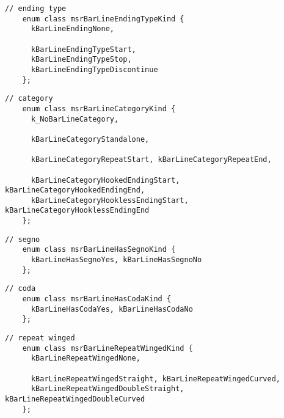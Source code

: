 \begin{lstlisting}[language=CPlusPlus]
    // ending type
    enum class msrBarLineEndingTypeKind {
      kBarLineEndingNone,

      kBarLineEndingTypeStart,
      kBarLineEndingTypeStop,
      kBarLineEndingTypeDiscontinue
    };
\end{lstlisting}

\begin{lstlisting}[language=CPlusPlus]
    // category
    enum class msrBarLineCategoryKind {
      k_NoBarLineCategory,

      kBarLineCategoryStandalone,

      kBarLineCategoryRepeatStart, kBarLineCategoryRepeatEnd,

      kBarLineCategoryHookedEndingStart, kBarLineCategoryHookedEndingEnd,
      kBarLineCategoryHooklessEndingStart, kBarLineCategoryHooklessEndingEnd
    };
\end{lstlisting}

\begin{lstlisting}[language=CPlusPlus]
    // segno
    enum class msrBarLineHasSegnoKind {
      kBarLineHasSegnoYes, kBarLineHasSegnoNo
    };
\end{lstlisting}

\begin{lstlisting}[language=CPlusPlus]
    // coda
    enum class msrBarLineHasCodaKind {
      kBarLineHasCodaYes, kBarLineHasCodaNo
    };

\end{lstlisting}

\begin{lstlisting}[language=CPlusPlus]
    // repeat winged
    enum class msrBarLineRepeatWingedKind {
      kBarLineRepeatWingedNone,

      kBarLineRepeatWingedStraight, kBarLineRepeatWingedCurved,
      kBarLineRepeatWingedDoubleStraight, kBarLineRepeatWingedDoubleCurved
    };
\end{lstlisting}

